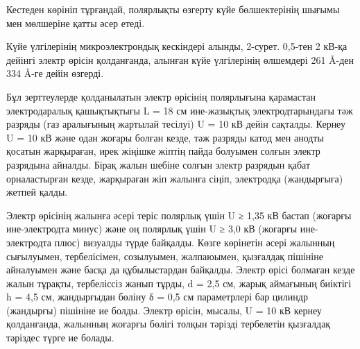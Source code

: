 \begin{multicols}{2}
Кестеден көрініп тұрғандай, полярлықты өзгерту күйе бөлшектерінің шығымы
мен мөлшеріне қатты әсер етеді.

Күйе үлгілерінің микроэлектрондық кескіндері алынды, 2-сурет. 0,5-тен 2
кВ-қа дейінгі электр өрісін қолданғанда, алынған күйе үлгілерінің
өлшемдері 261 Å-ден 334 Å-ге дейін өзгерді.

Бұл зерттеулерде қолданылатын электр өрісінің полярлығына қарамастан
электродаралық қашықтықтығы L = 18 см ине-жазықтық электродтарындағы тәж
разряды (газ аралығының жартылай тесілуі) U = 10 кВ дейін сақталды.
Кернеу U = 10 кВ және одан жоғары болған кезде, тәж разряды катод мен
анодты қосатын жарқыраған, ирек жіңішке жіптің пайда болуымен солғын
электр разрядына айналды. Бірақ жалын шебіне солғын электр разрядын
қабат орналастырған кезде, жарқыраған жіп жалынға сіңіп, электродқа
(жандырғыға) жетпей қалды.

Электр өрісінің жалынға әсері теріс полярлық үшін U ≥ 1,35 кВ бастап
(жоғарғы ине-электродта минус) және оң полярлық үшін U ≥ 3,0 кВ (жоғарғы
ине-электродта плюс) визуалды түрде байқалды. Көзге көрінетін әсері
жалынның сығылуымен, тербелісімен, созылуымен, жалпаюымен, қызғалдақ
пішініне айналуымен және басқа да құбылыстардан байқалды. Электр өрісі
болмаған кезде жалын тұрақты, тербеліссіз жанып тұрды, d = 2,5 см, жарық
аймағының биіктігі h = 4,5 см, жандырғыдан бөліну δ = 0,5 см
параметрлері бар цилиндр (жандырғы) пішініне ие болды. Электр өрісін,
мысалы, U = 10 кВ кернеу қолданғанда, жалынның жоғарғы бөлігі толқын
тәрізді тербелетін қызғалдақ тәріздес түрге ие болады.
\end{multicols}

